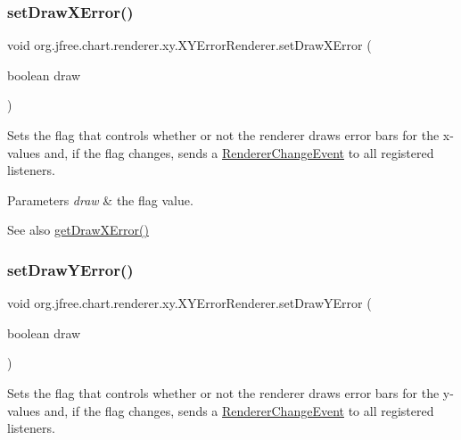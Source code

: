 \subsubsection{\texorpdfstring{set\+Draw\+X\+Error()}{setDrawXError()}}
{\footnotesize\ttfamily void org.\+jfree.\+chart.\+renderer.\+xy.\+X\+Y\+Error\+Renderer.\+set\+Draw\+X\+Error (\begin{DoxyParamCaption}\item[{boolean}]{draw }\end{DoxyParamCaption})}

Sets the flag that controls whether or not the renderer draws error bars for the x-\/values and, if the flag changes, sends a \mbox{\hyperlink{}{Renderer\+Change\+Event}} to all registered listeners.


\begin{DoxyParams}{Parameters}
{\em draw} & the flag value.\\
\hline
\end{DoxyParams}
\begin{DoxySeeAlso}{See also}
\mbox{\hyperlink{classorg_1_1jfree_1_1chart_1_1renderer_1_1xy_1_1_x_y_error_renderer_ab1a5ab1db9b1a1c185c3258a3abf6d84}{get\+Draw\+X\+Error()}} 
\end{DoxySeeAlso}
\mbox{\label{classorg_1_1jfree_1_1chart_1_1renderer_1_1xy_1_1_x_y_error_renderer_a46148e12e76dcd87d154d10127632570}} 
\subsubsection{\texorpdfstring{set\+Draw\+Y\+Error()}{setDrawYError()}}
{\footnotesize\ttfamily void org.\+jfree.\+chart.\+renderer.\+xy.\+X\+Y\+Error\+Renderer.\+set\+Draw\+Y\+Error (\begin{DoxyParamCaption}\item[{boolean}]{draw }\end{DoxyParamCaption})}

Sets the flag that controls whether or not the renderer draws error bars for the y-\/values and, if the flag changes, sends a \mbox{\hyperlink{}{Renderer\+Change\+Event}} to all registered listeners.


